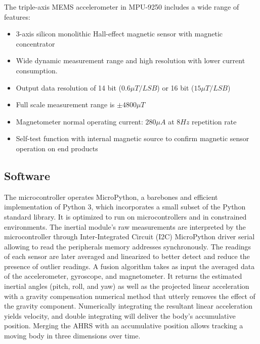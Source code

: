 The triple-axis MEMS accelerometer in MPU-9250 includes a wide range of features:
\begin{itemize}
  \item 3-axis silicon monolithic Hall-effect magnetic sensor with magnetic concentrator
  \item Wide dynamic measurement range and high resolution with lower current consumption.
  \item Output data resolution of 14 bit ($0.6 \mu T/LSB$) or 16 bit ($15 \mu T/LSB$)
  \item Full scale measurement range is $\pm 4800 \mu T$
  \item Magnetometer normal operating current: $280\mu A$ at $8 Hz$ repetition rate
  \item Self-test function with internal magnetic source to confirm magnetic sensor operation on end products
\end{itemize}

\begin{figure}[H]
  \centering
  
\end{figure}

\subsection{Software}
The microcontroller operates MicroPython, a barebones and efficient implementation of Python 3, which incorporates a small subset of the Python standard library. It is optimized to run on microcontrollers and in constrained environments. The inertial module's raw measurements are interpreted by the microcontroller through Inter-Integrated Circuit (I2C) MicroPython driver serial allowing to read the peripherals memory addresses synchronously. The readings of each sensor are later averaged and linearized to better detect and reduce the presence of outlier readings. A fusion algorithm takes as input the averaged data of the accelerometer, gyroscope, and magnetometer. It returns the estimated inertial angles (pitch, roll, and yaw) as well as the projected linear acceleration with a gravity compensation numerical method that utterly removes the effect of the gravity component. Numerically integrating the resultant linear acceleration yields velocity, and double integrating will deliver the body's accumulative position. Merging the AHRS with an accumulative position allows tracking a moving body in three dimensions over time.

